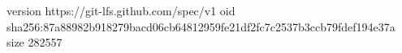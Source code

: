 version https://git-lfs.github.com/spec/v1
oid sha256:87a88982b918279bacd06cb64812959fe21df2fc7c2537b3ccb79fdef194e37a
size 282557
